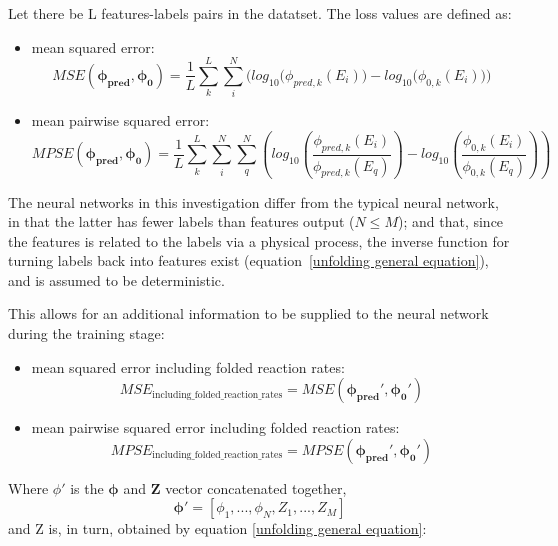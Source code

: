\documentclass[a4paper, 12pt]{article}
\newcommand{\ve}[1]{\boldsymbol{#1}}
\begin{document}
    Let there be L features-labels pairs in the datatset. The loss values are defined as:
    \begin{itemize}
        \item mean squared error:
        \begin{equation}\label{MSE}
            MSE(\ve{\phi_{pred}},\ve{\phi_0}) = \frac{1}{L} \sum_{k}^L \sum_i^N \bigg( log_{10}\big(\phi_{pred,k}(E_i)\big)-log_{10}\big(\phi_{0,k}(E_i)\big) \bigg)
        \end{equation}
        \item mean pairwise squared error:
        \begin{equation}\label{MPSE}
            MPSE(\ve{\phi_{pred}}, \ve{\phi_{0}}) = \frac{1}{L} \sum_{k}^L \sum_i^N \sum_q^N \left( log_{10}\left(\frac{\phi_{pred,k}(E_i)}{\phi_{pred,k}(E_q)}\right)-log_{10}\left(\frac{\phi_{0,k}(E_i)}{\phi_{0,k}(E_q)}\right) \right)
        \end{equation}

    \end{itemize}
    The neural networks in this investigation differ from the typical neural network, in that the latter has fewer labels than features output ($N \le M$); and that, since the features is related to the labels via a physical process, the inverse function for turning labels back into features exist (equation~\ref{unfolding general equation}), and is assumed to be deterministic.
    
    This allows for an additional information to be supplied to the neural network during the training stage:
        
    \begin{itemize}
        \item mean squared error including folded reaction rates:
        \begin{equation}\label{MSE_including_folded_reaction_rates}
            MSE_{\text{including\_folded\_reaction\_rates}}=MSE(\ve{\phi_{pred}'},\ve{\phi_{0}'})
        \end{equation}
        \item mean pairwise squared error including folded reaction rates:
        \begin{equation}\label{MPSE_including_folded_reaction_rates}
            MPSE_{\text{including\_folded\_reaction\_rates}} = MPSE(\ve{\phi_{pred}'},\ve{\phi_{0}'})
        \end{equation}
    \end{itemize}
    Where $\phi'$ is the $\ve{\phi}$ and $\ve{Z}$ vector concatenated together,
    \begin{equation}\label{NNregularization}
        \ve{\phi'} = [\phi_1, ..., \phi_N, Z_1, ..., Z_M]
    \end{equation}
    and Z is, in turn, obtained by equation \ref{unfolding general equation}:
\end{document}
